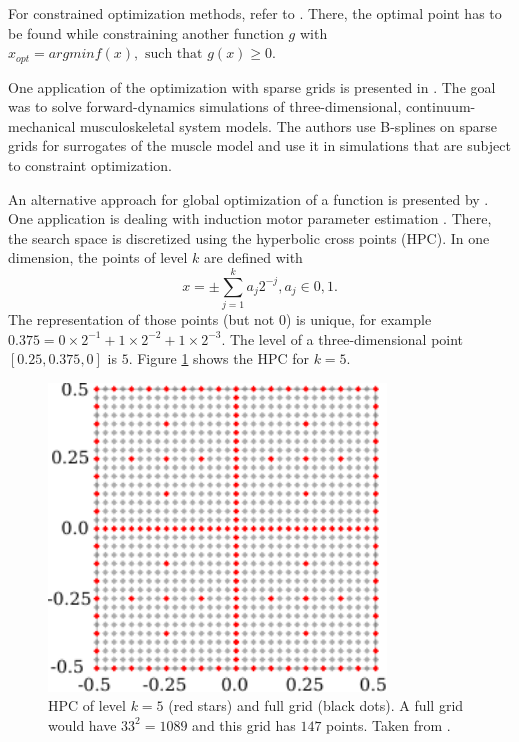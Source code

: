 For constrained optimization methods, refer to \cite{b_splines}. There, the optimal point has to be found while constraining another function $ g $ with $ x_{opt} = arg min f(x), \text{ such that } g(x) \ge 0 $. 
\newline 

One application of the optimization with sparse grids is presented in \cite{valentin2018gradient}. The goal was to solve forward-dynamics simulations of three-dimensional, continuum-mechanical musculoskeletal system models. The authors use B-splines on sparse grids for surrogates of the muscle model and use it in simulations that are subject to constraint optimization. 
\newline 

An alternative approach for global optimization of a function is presented by \cite{novak1996global}. One application is dealing with induction motor parameter estimation \cite{duan2016induction}. There, the search space is discretized using the hyperbolic cross points (HPC). In one dimension, the points of level $ k $ are defined with 
\begin{equation}
	x = \pm \sum_{j=1}^{k} a_j 2^{-j}, a_j \in {0,1}.
\end{equation}
The representation of those points (but not $ 0 $) is unique, for example $ 0.375 = 0 \times 2^{-1} + 1 \times 2^{-2} + 1 \times 2 ^{-3} $. The level of a three-dimensional point $ [0.25, 0.375, 0] $ is $ 5 $. Figure \ref{fig:hyperbolic} shows the HPC for $ k = 5 $.

\begin{figure}[H]
	\centering
	\includegraphics[width=0.8\textwidth]{figures/Fig_2_12_altern_sparse}
	\caption{ HPC of level $ k = 5 $ (red stars) and full grid (black dots). A full grid would have $ 33^2 = 1089 $ and this grid has $ 147 $ points. Taken from \cite{duan2016induction}.}
	\label{fig:hyperbolic}
\end{figure}

